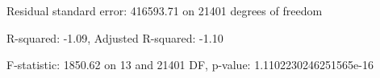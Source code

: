 Residual standard error: 416593.71 on 21401 degrees of freedom

R-squared: -1.09, Adjusted R-squared: -1.10

F-statistic: 1850.62 on 13 and 21401 DF, p-value: 1.1102230246251565e-16

